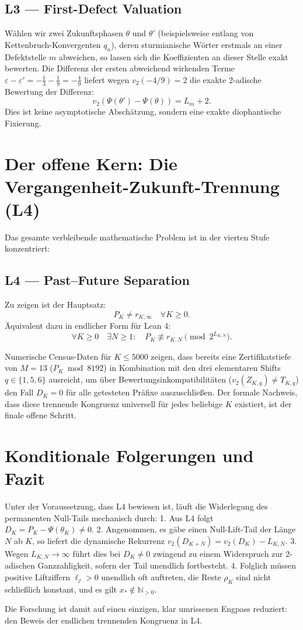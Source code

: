 \documentclass[11pt,a4paper]{article}
\begin{document}
\subsection*{L3 --- First-Defect Valuation}
Wählen wir zwei Zukunftsphasen $\theta$ und $\theta'$ (beispielsweise entlang von Kettenbruch-Konvergenten $q_n$), deren sturmianische Wörter erstmals an einer Defektstelle $m$ abweichen, so lassen sich die Koeffizienten an dieser Stelle exakt bewerten. Die Differenz der ersten abweichend wirkenden Terme $\varepsilon - \varepsilon' = -\frac{1}{3} - \frac{1}{9} = -\frac{4}{9}$ liefert wegen $v_2(-4/9) = 2$ die exakte 2-adische Bewertung der Differenz:
$$\boxed{v_2\left(\Psi(\theta') - \Psi(\theta)\right) = L_m + 2.}$$
Dies ist keine asymptotische Abschätzung, sondern eine exakte diophantische Fixierung.

\section{Der offene Kern: Die Vergangenheit-Zukunft-Trennung (L4)}

Das gesamte verbleibende mathematische Problem ist in der vierten Stufe konzentriert:

\subsection*{L4 --- Past--Future Separation}
Zu zeigen ist der Hauptsatz:
$$\boxed{P_K \neq r_{K,\infty} \quad \forall K \ge 0.}$$
Äquivalent dazu in endlicher Form für Lean 4:
$$\boxed{\forall K \ge 0 \quad \exists N \ge 1: \quad P_K \not\equiv r_{K,N} \pmod{2^{L_{K,N}}}.}$$

Numerische Census-Daten für $K \le 5000$ zeigen, dass bereits eine Zertifikatstiefe von $M = 13$ ($P_K \bmod 8192$) in Kombination mit den drei elementaren Shifts $q \in \{1, 5, 6\}$ ausreicht, um über Bewertungsinkompatibilitäten ($v_2(Z_{K,q}) \neq T_{K,q}$) den Fall $D_K = 0$ für alle getesteten Präfixe auszuschließen. Der formale Nachweis, dass diese trennende Kongruenz universell für jedes beliebige $K$ existiert, ist der finale offene Schritt.

\section{Konditionale Folgerungen und Fazit}

Unter der Voraussetzung, dass L4 bewiesen ist, läuft die Widerlegung des permanenten Null-Tails mechanisch durch:
1. Aus L4 folgt $D_K = P_K - \Psi(\theta_K) \neq 0$.
2. Angenommen, es gäbe einen Null-Lift-Tail der Länge $N$ ab $K$, so liefert die dynamische Rekurrenz $v_2(D_{K+N}) = v_2(D_K) - L_{K,N}$.
3. Wegen $L_{K,N} \to \infty$ führt dies bei $D_K \neq 0$ zwingend zu einem Widerspruch zur 2-adischen Ganzzahligkeit, sofern der Tail unendlich fortbesteht.
4. Folglich müssen positive Liftziffern $\ell_j > 0$ unendlich oft auftreten, die Reste $\rho_K$ sind nicht schließlich konstant, und es gilt $x_* \notin \mathbb{N}_{>0}$.

Die Forschung ist damit auf einen einzigen, klar umrissenen Engpass reduziert: den Beweis der endlichen trennenden Kongruenz in L4.
\end{document}
